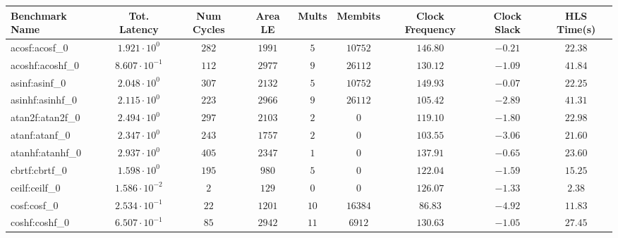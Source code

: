 \begin{tabular}{|l|c|c|c|c|c|c|c|c|}
\hline
Benchmark Name               & Tot. Latency            & Num Cycles & Area LE   & Mults   & Membits    & Clock Frequency & Clock Slack & HLS Time(s) \\
\hline
acosf:acosf\_0               & $ 1.921 \cdot 10^{0}  $ & $ 282    $ & $ 1991  $ & $ 5   $ & $ 10752  $ & $ 146.80      $ & $ -0.21   $ & $ 22.38   $ \\
acoshf:acoshf\_0             & $ 8.607 \cdot 10^{-1} $ & $ 112    $ & $ 2977  $ & $ 9   $ & $ 26112  $ & $ 130.12      $ & $ -1.09   $ & $ 41.84   $ \\
asinf:asinf\_0               & $ 2.048 \cdot 10^{0}  $ & $ 307    $ & $ 2132  $ & $ 5   $ & $ 10752  $ & $ 149.93      $ & $ -0.07   $ & $ 22.25   $ \\
asinhf:asinhf\_0             & $ 2.115 \cdot 10^{0}  $ & $ 223    $ & $ 2966  $ & $ 9   $ & $ 26112  $ & $ 105.42      $ & $ -2.89   $ & $ 41.31   $ \\
atan2f:atan2f\_0             & $ 2.494 \cdot 10^{0}  $ & $ 297    $ & $ 2103  $ & $ 2   $ & $ 0      $ & $ 119.10      $ & $ -1.80   $ & $ 22.98   $ \\
atanf:atanf\_0               & $ 2.347 \cdot 10^{0}  $ & $ 243    $ & $ 1757  $ & $ 2   $ & $ 0      $ & $ 103.55      $ & $ -3.06   $ & $ 21.60   $ \\
atanhf:atanhf\_0             & $ 2.937 \cdot 10^{0}  $ & $ 405    $ & $ 2347  $ & $ 1   $ & $ 0      $ & $ 137.91      $ & $ -0.65   $ & $ 23.60   $ \\
cbrtf:cbrtf\_0               & $ 1.598 \cdot 10^{0}  $ & $ 195    $ & $ 980   $ & $ 5   $ & $ 0      $ & $ 122.04      $ & $ -1.59   $ & $ 15.25   $ \\
ceilf:ceilf\_0               & $ 1.586 \cdot 10^{-2} $ & $ 2      $ & $ 129   $ & $ 0   $ & $ 0      $ & $ 126.07      $ & $ -1.33   $ & $ 2.38    $ \\
cosf:cosf\_0                 & $ 2.534 \cdot 10^{-1} $ & $ 22     $ & $ 1201  $ & $ 10  $ & $ 16384  $ & $ 86.83       $ & $ -4.92   $ & $ 11.83   $ \\
coshf:coshf\_0               & $ 6.507 \cdot 10^{-1} $ & $ 85     $ & $ 2942  $ & $ 11  $ & $ 6912   $ & $ 130.63      $ & $ -1.05   $ & $ 27.45   $ \\

\end{tabular}
